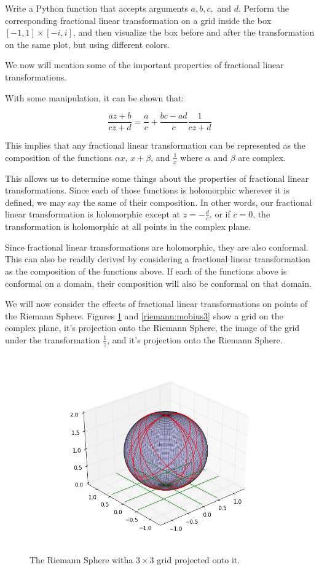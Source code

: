 \begin{problem} Write a Python function that accepts arguments $a,b,c,$ and $d$.
Perform the corresponding fractional linear transformation on a grid inside the box $[-1,1]\times[-i,i]$, and then visualize the box before and after the transformation on the same plot, but using different colors.
\end{problem}

We now will mention some of the important properties of fractional linear transformations.

With some manipulation, it can be shown that:

$$\frac{az+b}{cz+d}=\frac{a}{c}+\frac{bc-ad}{c} \frac{1}{cz+d}$$

This implies that any fractional linear transformation can be represented as the composition of the functions $\alpha x$, $x+\beta$, and $\frac{1}{x}$ where $\alpha$ and $\beta$ are complex. 

This allows us to determine some things about the properties of fractional linear transformations.
Since each of those functions is holomorphic wherever it is defined, we may say the same of their composition.
In other words, our fractional linear transformation is holomorphic except at $z=-\frac{d}{c}$, or if $c=0$, the transformation is holomorphic at all points in the complex plane. 

Since fractional linear transformations are holomorphic, they are also conformal.
This can also be readily derived by considering a fractional linear transformation as the composition of the functions above.
If each of the functions above is conformal on a domain, their composition will also be conformal on that domain. 

We will now consider the effects of fractional linear transformations on points of the Riemann Sphere.
Figures \ref{riemann:mobius2} and \ref{riemann:mobius3} show a grid on the complex plane, it's projection onto the Riemann Sphere, the image of the grid under the transformation $\frac{1}{z}$, and it's projection onto the Riemann Sphere. 

\begin{figure}
\includegraphics[width=\textwidth]{mobius2.png}
\caption{The Riemann Sphere witha $3\times 3$ grid projected onto it.}
\label{riemann:mobius2}
\end{figure}

